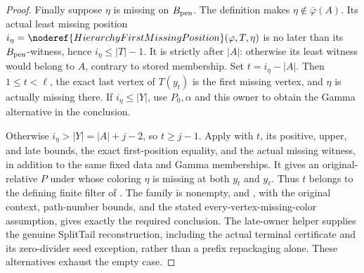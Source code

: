 \begin{proof}
Finally suppose $\eta$ is missing on $B_{\rm pen}$.
The definition  makes
$\eta\notin\overline\varphi(A)$. Its actual least missing position
$i_\eta=\noderef{HierarchyFirstMissingPosition}(\varphi,T,\eta)$
is no later than its $B_{\rm pen}$-witness, hence
$i_\eta\le|T|-1$. It is strictly after $|A|$: otherwise its least
witness would belong to $A$, contrary to stored membership.
Set $t=i_\eta-|A|$. Then $1\le t<\ell$, the exact last vertex of
$T(y_t)$ is the first missing vertex, and $\eta$ is actually missing
there. If $i_\eta\le|Y|$, use $P_0,\alpha$ and this owner to obtain
the Gamma alternative in the conclusion.

Otherwise $i_\eta>|Y|=|A|+j-2$, so $t\ge j-1$.
Apply  with $t$, its positive,
upper, and late bounds, the exact first-position equality, and the
actual missing witness, in addition to the same fixed data and Gamma
memberships. It gives an original-relative $P$ under whose coloring
$\eta$ is missing at both $y_t$ and $y_\ell$. Thus $t$ belongs to
the defining finite filter of
. The family is
nonempty, and ,
with the original context, path-number bounds, and the stated
every-vertex-missing-color assumption, gives exactly the required
conclusion. The late-owner helper supplies the genuine SplitTail
reconstruction, including the actual terminal certificate and its
zero-divider seed exception, rather than a prefix repackaging alone.
These alternatives exhaust the empty case.
\end{proof}
